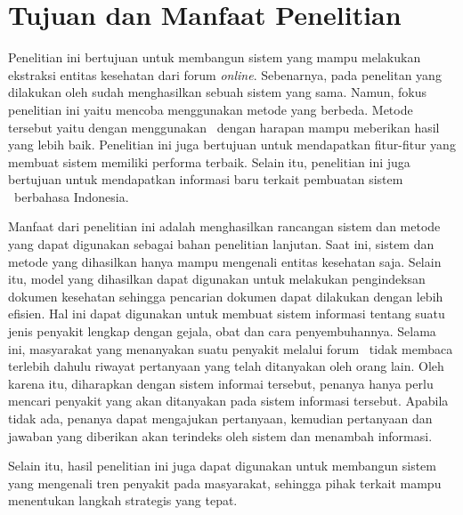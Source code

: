 \section{Tujuan dan Manfaat Penelitian}
Penelitian ini bertujuan untuk membangun sistem yang mampu melakukan ekstraksi entitas kesehatan dari forum \textit{online}. Sebenarnya, pada penelitan yang dilakukan oleh \cite{skripsiKakRadit} sudah menghasilkan sebuah sistem yang sama. Namun, fokus penelitian ini yaitu mencoba menggunakan metode yang berbeda. Metode tersebut yaitu dengan menggunakan \rnn~dengan harapan mampu meberikan hasil yang lebih baik. Penelitian ini juga bertujuan untuk mendapatkan fitur-fitur yang membuat sistem memiliki performa terbaik. Selain itu, penelitian ini juga bertujuan untuk mendapatkan informasi baru terkait pembuatan sistem \mer~berbahasa Indonesia.

Manfaat dari penelitian ini adalah menghasilkan rancangan sistem dan metode yang dapat digunakan sebagai bahan penelitian lanjutan. Saat ini, sistem dan metode yang dihasilkan hanya mampu mengenali entitas kesehatan saja. Selain itu, model yang dihasilkan dapat digunakan untuk melakukan pengindeksan dokumen kesehatan sehingga pencarian dokumen dapat dilakukan dengan lebih efisien. Hal ini dapat digunakan untuk membuat sistem informasi tentang suatu jenis penyakit lengkap dengan gejala, obat dan cara penyembuhannya. Selama ini, masyarakat yang menanyakan suatu penyakit melalui forum \ol~tidak membaca terlebih dahulu riwayat pertanyaan yang telah ditanyakan oleh orang lain. Oleh karena itu, diharapkan dengan sistem informai tersebut, penanya hanya perlu mencari penyakit yang akan ditanyakan pada sistem informasi tersebut. Apabila tidak ada, penanya dapat mengajukan pertanyaan, kemudian pertanyaan dan jawaban yang diberikan akan terindeks oleh sistem dan menambah informasi. 

Selain itu, hasil penelitian ini juga dapat digunakan untuk membangun sistem yang mengenali tren penyakit pada masyarakat, sehingga pihak terkait mampu menentukan langkah strategis yang tepat.

